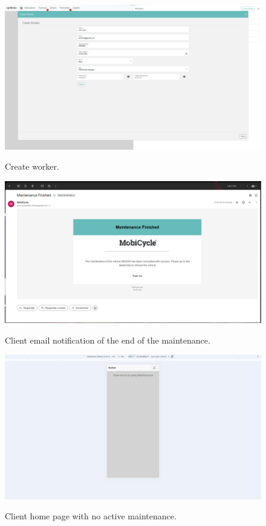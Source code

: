 \begin{figure}[htbp]
  \caption{Create worker.}
  \centering
  \includegraphics[width=\textwidth]{figs/Implementation/workshopmanager/workerCreate}
  \label{fig:workerCreate}
\end{figure}


\begin{figure}[htbp]
  \caption{Client email notification of the end of the maintenance.}
  \centering
  \includegraphics[width=\textwidth]{figs/Implementation/client/MaintenanceFinishedNotification}
  \label{fig:MaintenanceFinishedNotification}
\end{figure}


\begin{figure}[htbp]
  \caption{Client home page with no active maintenance.}
  \centering
  \includegraphics[width=\textwidth]{figs/Implementation/client/MaintenanceNoState}
  \label{fig:MaintenanceNoState}
\end{figure}



